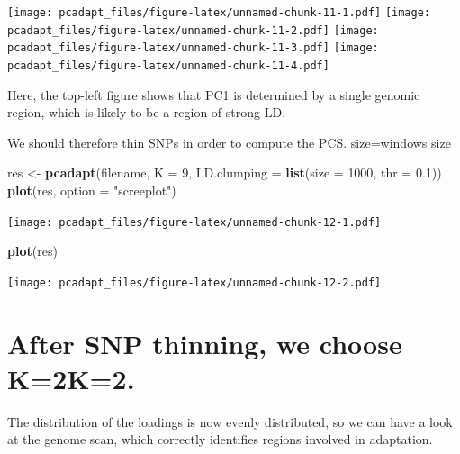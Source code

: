 \documentclass[]{article}
\newenvironment{Shaded}{\begin{snugshade}}{\end{snugshade}}
\newcommand{\KeywordTok}[1]{\textcolor[rgb]{0.13,0.29,0.53}{\textbf{#1}}}
\newcommand{\DataTypeTok}[1]{\textcolor[rgb]{0.13,0.29,0.53}{#1}}
\newcommand{\DecValTok}[1]{\textcolor[rgb]{0.00,0.00,0.81}{#1}}
\newcommand{\FloatTok}[1]{\textcolor[rgb]{0.00,0.00,0.81}{#1}}
\newcommand{\StringTok}[1]{\textcolor[rgb]{0.31,0.60,0.02}{#1}}
\newcommand{\ControlFlowTok}[1]{\textcolor[rgb]{0.13,0.29,0.53}{\textbf{#1}}}
\newcommand{\OperatorTok}[1]{\textcolor[rgb]{0.81,0.36,0.00}{\textbf{#1}}}
\newcommand{\NormalTok}[1]{#1}
\begin{document}
\texttt{[image: pcadapt\_files/figure-latex/unnamed-chunk-11-1.pdf]}
\texttt{[image: pcadapt\_files/figure-latex/unnamed-chunk-11-2.pdf]}
\texttt{[image: pcadapt\_files/figure-latex/unnamed-chunk-11-3.pdf]}
\texttt{[image: pcadapt\_files/figure-latex/unnamed-chunk-11-4.pdf]}

Here, the top-left figure shows that PC1 is determined by a single
genomic region, which is likely to be a region of strong LD.

We should therefore thin SNPs in order to compute the PCS. size=windows
size

\begin{Shaded}
\begin{Highlighting}[]
\NormalTok{res <-}\StringTok{ }\KeywordTok{pcadapt}\NormalTok{(filename, }\DataTypeTok{K =} \DecValTok{9}\NormalTok{, }\DataTypeTok{LD.clumping =} \KeywordTok{list}\NormalTok{(}\DataTypeTok{size =} \DecValTok{1000}\NormalTok{, }\DataTypeTok{thr =} \FloatTok{0.1}\NormalTok{))}
\KeywordTok{plot}\NormalTok{(res, }\DataTypeTok{option =} \StringTok{"screeplot"}\NormalTok{)}
\end{Highlighting}
\end{Shaded}

\texttt{[image: pcadapt\_files/figure-latex/unnamed-chunk-12-1.pdf]}

\begin{Shaded}
\begin{Highlighting}[]
\KeywordTok{plot}\NormalTok{(res)}
\end{Highlighting}
\end{Shaded}

\texttt{[image: pcadapt\_files/figure-latex/unnamed-chunk-12-2.pdf]}

\section{After SNP thinning, we choose
K=2K=2.}\label{after-snp-thinning-we-choose-k2k2.}

The distribution of the loadings is now evenly distributed, so we can
have a look at the genome scan, which correctly identifies regions
involved in adaptation.

\begin{Shaded}
\end{Shaded}
\end{document}
